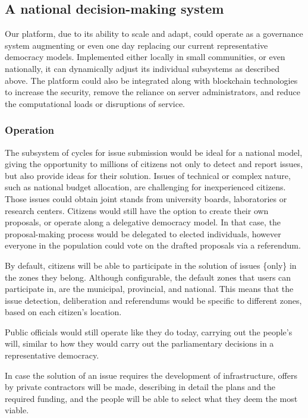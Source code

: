 \documentclass[a4paper,11pt]{article}
\begin{document}
\begin{multicols}{2}
\subsection{A national decision-making system} \label{national}

Our platform, due to its ability to scale and adapt, could operate as a governance system augmenting or even one day replacing our current representative democracy models. Implemented either locally in small communities, or even nationally, it can dynamically adjust its individual subsystems as described above. The platform could also be integrated along with blockchain technologies to increase the security, remove the reliance on server administrators, and reduce the computational loads or disruptions of service.

\subsubsection{Operation} \label{operationnational}

The subsystem of cycles for issue submission would be ideal for a national model, giving the opportunity to millions of citizens not only to detect and report issues, but also provide ideas for their solution. Issues of technical or complex nature, such as national budget allocation, are challenging for inexperienced citizens. Those issues could obtain joint stands from university boards, laboratories or research centers. Citizens would still have the option to create their own proposals, or operate along a delegative democracy model. In that case, the proposal-making process would be delegated to elected individuals, however everyone in the population could vote on the drafted proposals via a referendum.

By default, citizens will be able to participate in the solution of issues \{only\} in the zones they belong. Although configurable, the default zones that users can participate in, are the municipal, provincial, and national. This means that the issue detection, deliberation and referendums would be specific to different zones, based on each citizen's location.

Public officials would still operate like they do today, carrying out the people's will, similar to how they would carry out the parliamentary decisions in a representative democracy.

In case the solution of an issue requires the development of infrastructure, offers by private contractors will be made, describing in detail the plans and the required funding, and the people will be able to select what they deem the most viable.


\end{multicols}
\end{document}
